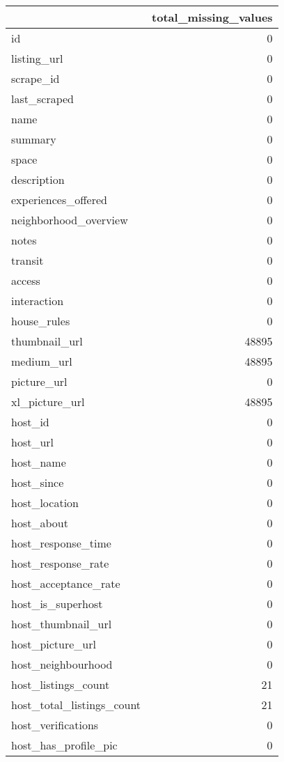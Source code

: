 \documentclass[
]{article}
\begin{document}
\begin{table}[H]
\centering
\begin{tabular}{l|r}
\hline
  & total\_missing\_values\\
\hline
id & 0\\
\hline
listing\_url & 0\\
\hline
scrape\_id & 0\\
\hline
last\_scraped & 0\\
\hline
name & 0\\
\hline
summary & 0\\
\hline
space & 0\\
\hline
description & 0\\
\hline
experiences\_offered & 0\\
\hline
neighborhood\_overview & 0\\
\hline
notes & 0\\
\hline
transit & 0\\
\hline
access & 0\\
\hline
interaction & 0\\
\hline
house\_rules & 0\\
\hline
thumbnail\_url & 48895\\
\hline
medium\_url & 48895\\
\hline
picture\_url & 0\\
\hline
xl\_picture\_url & 48895\\
\hline
host\_id & 0\\
\hline
host\_url & 0\\
\hline
host\_name & 0\\
\hline
host\_since & 0\\
\hline
host\_location & 0\\
\hline
host\_about & 0\\
\hline
host\_response\_time & 0\\
\hline
host\_response\_rate & 0\\
\hline
host\_acceptance\_rate & 0\\
\hline
host\_is\_superhost & 0\\
\hline
host\_thumbnail\_url & 0\\
\hline
host\_picture\_url & 0\\
\hline
host\_neighbourhood & 0\\
\hline
host\_listings\_count & 21\\
\hline
host\_total\_listings\_count & 21\\
\hline
host\_verifications & 0\\
\hline
host\_has\_profile\_pic & 0\\

\end{tabular}
\end{table}
\end{document}
